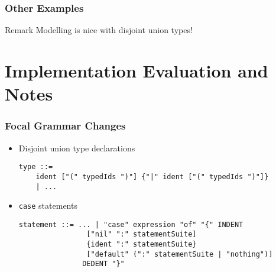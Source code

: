 \documentclass{beamer}
\begin{document}
\begin{frame}
\frametitle{Other Examples}
    
\usebox{\exampleImagination}

\begin{block}{Remark}
Modelling is nice with disjoint union types!
\end{block}
\end{frame}

\section{Implementation Evaluation and Notes}

\begin{frame}[fragile]
\frametitle{Focal Grammar Changes}

\begin{itemize}
 \item<1-> Disjoint union type declarations
    {\small \begin{verbatim}
type ::=
    ident ["(" typedIds ")"] {"|" ident ["(" typedIds ")"]} 
    | ...
            \end{verbatim}}

 \item<2-> \texttt{case} statements
{\small \begin{verbatim}
statement ::= ... | "case" expression "of" "{" INDENT 
                ["nil" ":" statementSuite] 
                {ident ":" statementSuite} 
                ["default" (":" statementSuite | "nothing")] 
               DEDENT "}"
    \end{verbatim}}

\end{itemize}

\end{frame}
\end{document}
